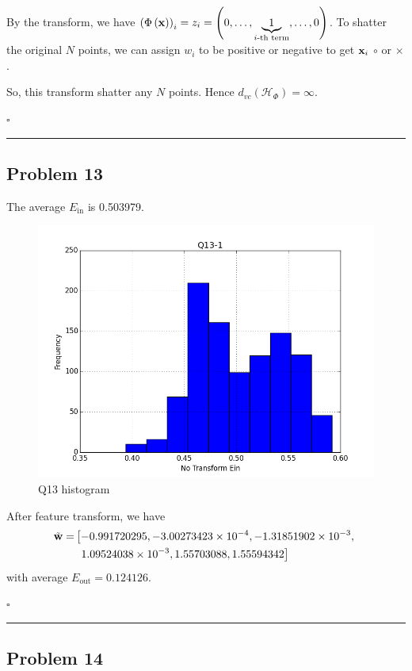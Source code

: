 \documentclass[12pt]{article}
\newcommand*{\QEDB}{\hfill\ensuremath{\square}}
\newcommand{\ParTh}[1]{\left(#1\right)}
\newcommand{\BF}[1]{{\bf#1}}
\newcommand{\SciNum}[2]{#1\times{10}^{#2}}
\newcommand{\horrule}[1]{\rule{\linewidth}{#1}}
\begin{document}
By the transform, we have $\ParTh{\Phi\ParTh{\BF{x}}}_i=z_i=\ParTh{0,\ldots,\underbrace{1}_{i\text{-th term}},\ldots,0}$. To shatter the original $N$ points, we can assign $w_i$ to be positive or negative to get $\BF{x}_i$ $\circ$ or $\times$.

So, this transform shatter any $N$ points. Hence $d_{vc}\ParTh{\mathcal{H}_\Phi}=\infty$.

\QEDB

\horrule{0.5pt}

\subsection*{Problem 13}

The average $E_{\text{in}}$ is 0.503979.
\begin{figure}[h]
	\centering
	\includegraphics[scale=0.3]{Q13-1.png}
	\caption{Q13 histogram}
	\label{Q13}
\end{figure}

After feature transform, we have
\begin{align}
\tilde{\BF{w}}=&\left[-0.991720295,\SciNum{-3.00273423}{-4},\SciNum{-1.31851902}{-3},\right.\\
\nonumber
&~\left.\SciNum{1.09524038}{-3},1.55703088,1.55594342\right]
\end{align}
with average $E_{\text{out}}=0.124126$.

\QEDB

\horrule{0.5pt}

\subsection*{Problem 14}
\end{document}
